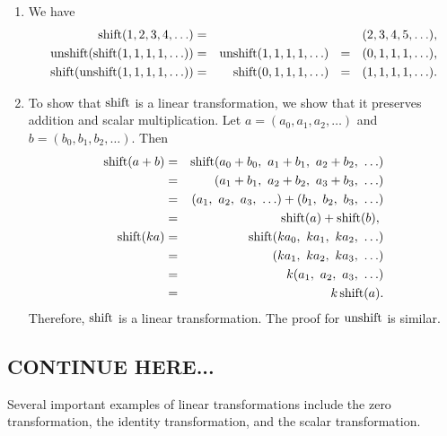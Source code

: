 \begin{solution}
  \begin{enumialphparenastyle}
    \begin{enumerate}
    \item We have
      \begin{eqnarray*}
        \shift(1,2,3,4,\ldots)
        &=& (2,3,4,5,\ldots), \\
        \unshift(\shift(1,1,1,1,\ldots))
        &=& \unshift(1,1,1,1,\ldots)
        ~~=~~ (0,1,1,1,\ldots), \\
        \shift(\unshift(1,1,1,1,\ldots))
        &=& \shift(0,1,1,1,\ldots)
        ~~=~~ (1,1,1,1,\ldots).            
      \end{eqnarray*}
    \item To show that $\shift$ is a linear transformation, we show
      that it preserves addition and scalar multiplication. Let
      $a=(a_0,a_1,a_2,\ldots)$ and $b=(b_0,b_1,b_2,\ldots)$. Then
      \begin{eqnarray*}
        \shift(a+b) &=& \shift(a_0+b_0,~a_1+b_1,~a_2+b_2,~\ldots) \\
                    &=& (a_1+b_1,~a_2+b_2,~a_3+b_3,~\ldots) \\
                    &=& (a_1,~a_2,~a_3,~\ldots) + (b_1,~b_2,~b_3,~\ldots) \\
                    &=& \shift(a) + \shift(b),~ \\
        \shift(ka)  &=& \shift(ka_0,~ka_1,~ka_2,~\ldots) \\
                    &=& (ka_1,~ka_2,~ka_3,~\ldots) \\
                    &=& k(a_1,~a_2,~a_3,~\ldots) \\
                    &=& k\shift(a). \\
      \end{eqnarray*}
      Therefore, $\shift$ is a linear transformation. The proof for
      $\unshift$ is similar.
    \end{enumerate}
  \end{enumialphparenastyle}
\end{solution}


\subsection{CONTINUE HERE...}

Several important examples of linear transformations include the zero
transformation, the identity transformation, and the scalar
transformation.

